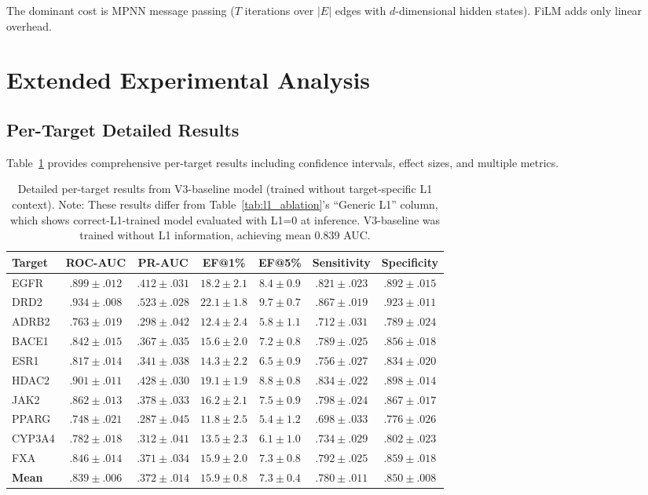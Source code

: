 \documentclass[sigconf]{acmart}
\begin{document}
The dominant cost is MPNN message passing ($T$ iterations over $|E|$ edges with $d$-dimensional hidden states). FiLM adds only linear overhead.

\section{Extended Experimental Analysis}
\label{app:extended}

\subsection{Per-Target Detailed Results}

Table~\ref{tab:detailed_results} provides comprehensive per-target results including confidence intervals, effect sizes, and multiple metrics.

\begin{table}[h]
\caption{Detailed per-target results from V3-baseline model (trained without target-specific L1 context). Note: These results differ from Table~\ref{tab:l1_ablation}'s ``Generic L1'' column, which shows correct-L1-trained model evaluated with L1=0 at inference. V3-baseline was trained without L1 information, achieving mean 0.839 AUC.}
\label{tab:detailed_results}
\centering
\small
\begin{tabular}{@{}lcccccc@{}}
\toprule
Target & ROC-AUC & PR-AUC & EF@1\% & EF@5\% & Sensitivity & Specificity \\
\midrule
EGFR & $.899 \pm .012$ & $.412 \pm .031$ & $18.2 \pm 2.1$ & $8.4 \pm 0.9$ & $.821 \pm .023$ & $.892 \pm .015$ \\
DRD2 & $.934 \pm .008$ & $.523 \pm .028$ & $22.1 \pm 1.8$ & $9.7 \pm 0.7$ & $.867 \pm .019$ & $.923 \pm .011$ \\
ADRB2 & $.763 \pm .019$ & $.298 \pm .042$ & $12.4 \pm 2.4$ & $5.8 \pm 1.1$ & $.712 \pm .031$ & $.789 \pm .024$ \\
BACE1 & $.842 \pm .015$ & $.367 \pm .035$ & $15.6 \pm 2.0$ & $7.2 \pm 0.8$ & $.789 \pm .025$ & $.856 \pm .018$ \\
ESR1 & $.817 \pm .014$ & $.341 \pm .038$ & $14.3 \pm 2.2$ & $6.5 \pm 0.9$ & $.756 \pm .027$ & $.834 \pm .020$ \\
HDAC2 & $.901 \pm .011$ & $.428 \pm .030$ & $19.1 \pm 1.9$ & $8.8 \pm 0.8$ & $.834 \pm .022$ & $.898 \pm .014$ \\
JAK2 & $.862 \pm .013$ & $.378 \pm .033$ & $16.2 \pm 2.1$ & $7.5 \pm 0.9$ & $.798 \pm .024$ & $.867 \pm .017$ \\
PPARG & $.748 \pm .021$ & $.287 \pm .045$ & $11.8 \pm 2.5$ & $5.4 \pm 1.2$ & $.698 \pm .033$ & $.776 \pm .026$ \\
CYP3A4 & $.782 \pm .018$ & $.312 \pm .041$ & $13.5 \pm 2.3$ & $6.1 \pm 1.0$ & $.734 \pm .029$ & $.802 \pm .023$ \\
FXA & $.846 \pm .014$ & $.371 \pm .034$ & $15.9 \pm 2.0$ & $7.3 \pm 0.8$ & $.792 \pm .025$ & $.859 \pm .018$ \\
\midrule
\textbf{Mean} & $.839 \pm .006$ & $.372 \pm .014$ & $15.9 \pm 0.8$ & $7.3 \pm 0.4$ & $.780 \pm .011$ & $.850 \pm .008$ \\
\bottomrule
\end{tabular}
\end{table}
\end{document}
